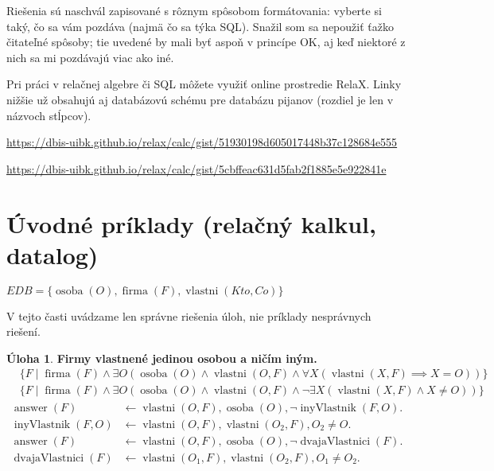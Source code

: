 \documentclass[10pt, a4paper]{article}
\theoremstyle{definition}
\newtheorem{problem}{Úloha}[section]
\DeclareMathOperator{\osoba}{osoba}
\DeclareMathOperator{\firma}{firma}
\DeclareMathOperator{\vlastni}{vlastni}
\DeclareMathOperator{\answer}{answer}
\begin{document}
Riešenia sú naschvál zapisované s rôznym spôsobom formátovania: vyberte si taký, čo sa vám pozdáva (najmä čo sa týka SQL).
Snažil som sa nepoužiť ťažko čitateľné spôsoby; tie uvedené by mali byť aspoň v princípe OK, aj keď niektoré z nich sa mi pozdávajú viac ako iné.

Pri práci v relačnej algebre či SQL môžete využiť online prostredie RelaX.
Linky nižšie už obsahujú aj databázovú schému pre databázu pijanov (rozdiel je len v názvoch stĺpcov).

\url{https://dbis-uibk.github.io/relax/calc/gist/51930198d605017448b37c128684e555}

\url{https://dbis-uibk.github.io/relax/calc/gist/5cbffeac631d5fab2f1885e5e922841e}


\section{Úvodné príklady (relačný kalkul, datalog)}

$EDB = \{\osoba(O), \firma(F), \vlastni(Kto, Co)\}$

V tejto časti uvádzame len správne riešenia úloh, nie príklady nesprávnych riešení.

\begin{problem}
{\bf Firmy vlastnené jedinou osobou a ničím iným.}
\begin{align*}
& \{F \mid \firma(F)\land \exists O (\osoba(O)\land \vlastni(O, F) \land \forall X (\vlastni(X, F) \implies X = O))\}\\
& \{F \mid \firma(F)\land \exists O (\osoba(O)\land \vlastni(O, F) \land \lnot \exists X (\vlastni(X, F) \land X \neq O))\}
\end{align*}
\begin{align*}
\answer(F) & \leftarrow \vlastni(O, F), \osoba(O), \neg \operatorname{inyVlastnik}(F, O).\\
\operatorname{inyVlastnik}(F, O) & \leftarrow \vlastni(O, F), \vlastni(O_2, F), O_2\neq O.
\end{align*}
\begin{align*}
\answer(F) & \leftarrow \vlastni(O, F), \osoba(O), \neg \operatorname{dvajaVlastnici}(F).\\
\operatorname{dvajaVlastnici}(F) & \leftarrow \vlastni(O_1, F), \vlastni(O_2, F), O_1\neq O_2.
\end{align*}
\end{problem}
\end{document}
